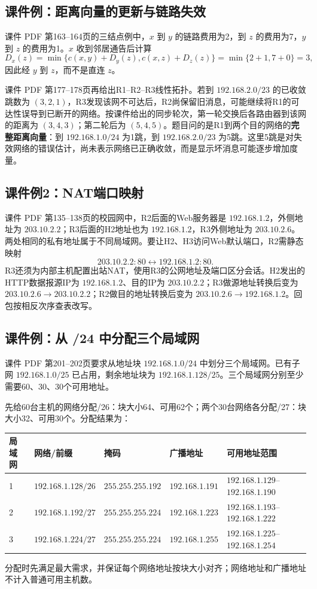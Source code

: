 \subsection{课件例：距离向量的更新与链路失效}
课件 PDF 第163--164页的三结点例中，$x$ 到 $y$ 的链路费用为2，到 $z$ 的费用为7，$y$ 到 $z$ 的费用为1。$x$ 收到邻居通告后计算
\[
D_x(z)=\min\{c(x,y)+D_y(z),c(x,z)+D_z(z)\}=\min\{2+1,7+0\}=3,
\]
因此经 $y$ 到 $z$，而不是直连 $z$。\par
课件 PDF 第177--178页再给出R1--R2--R3线性拓扑。若到 $192.168.2.0/23$ 的已收敛跳数为 $(3,2,1)$，R3发现该网不可达后，R2尚保留旧消息，可能继续将R1的可达性误导到已断开的网络。按课件给出的同步轮次，第一轮交换后各路由器到该网的距离为 $(3,4,3)$；第二轮后为 $(5,4,5)$。题目问的是R1到两个目的网络的\textbf{完整距离向量}：到 $192.168.1.0/24$ 为1跳，到 $192.168.2.0/23$ 为5跳。这里5跳是对失效网络的错误估计，尚未表示网络已正确收敛，而是显示坏消息可能逐步增加度量。\annotationarea[4]

\subsection{课件例2：NAT端口映射}
课件 PDF 第135--138页的校园网中，R2后面的Web服务器是 $192.168.1.2$，外侧地址为 $203.10.2.2$；R3后面的H2地址也为 $192.168.1.2$，R3外侧地址为 $203.10.2.6$。两处相同的私有地址属于不同局域网。要让H2、H3访问Web默认端口，R2需静态映射
\[
203.10.2.2:80\longleftrightarrow 192.168.1.2:80.
\]
R3还须为内部主机配置出站NAT，使用R3的公网地址及端口区分会话。H2发出的HTTP数据报源IP为 $192.168.1.2$、目的IP为 $203.10.2.2$；R3做源地址转换后变为 $203.10.2.6\to203.10.2.2$；R2做目的地址转换后变为 $203.10.2.6\to192.168.1.2$。回包按相反次序查表改写。\annotationarea[4]

\subsection{课件例：从 /24 中分配三个局域网}
课件 PDF 第201--202页要求从地址块 $192.168.1.0/24$ 中划分三个局域网。已有子网 $192.168.1.0/25$ 已占用，剩余地址块为 $192.168.1.128/25$。三个局域网分别至少需要60、30、30个可用地址。\par
先给60台主机的网络分配/26：块大小64、可用62个；两个30台网络各分配/27：块大小32、可用30个。分配结果为：
\begin{center}\begin{tabular}{lllll}\toprule 局域网 & 网络/前缀 & 掩码 & 广播地址 & 可用地址范围\\\midrule
1 & $192.168.1.128/26$ & $255.255.255.192$ & $192.168.1.191$ & $192.168.1.129$--$192.168.1.190$\\
2 & $192.168.1.192/27$ & $255.255.255.224$ & $192.168.1.223$ & $192.168.1.193$--$192.168.1.222$\\
3 & $192.168.1.224/27$ & $255.255.255.224$ & $192.168.1.255$ & $192.168.1.225$--$192.168.1.254$\\\bottomrule\end{tabular}\end{center}
分配时先满足最大需求，并保证每个网络地址按块大小对齐；网络地址和广播地址不计入普通可用主机数。\annotationarea[4]

